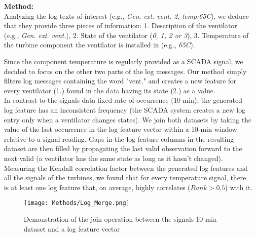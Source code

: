    \begin{flushleft}
      \textbf{Method:}\\
      Analyzing the log texts of interest (e.g., \emph{Gen. ext. vent. 2, temp:65\degree C}), we deduce that they provide three pieces of information: 
      1. Description of the ventilator (e.g., \emph{Gen. ext. vent.}), 2. State of the ventilator (\emph{0, 1, 2 or 3}), 
      3. Temperature of the turbine component the ventilator is installed in (e.g., \emph{65\degree C}).
    \end{flushleft}
    Since the component temperature is regularly provided as a SCADA signal, we decided to focus on the other two parts of the log messages. 
    Our method simply filters log messages containing the word "vent." and creates a new feature for every ventilator (1.) found in the data having its state (2.) as a value.\\
    In contrast to the signals data fixed rate of occurrence (10 min), the generated log feature has an inconsistent frequency (the SCADA system creates a new log entry only 
    when a ventilator changes states). We join both datasets by taking the value of the last occurrence in the log feature vector within a 10-min window relative to a signal reading. 
    Gaps in the log feature columns in the resulting dataset are then filled by propagating the last valid observation forward to the next valid (a ventilator has the same state as long as it hasn't changed).\\
    Measuring the Kendall correlation factor between the generated log features and all the signals of the turbines, we found that for every temperature signal, there is at least 
    one log feature that, on average, highly correlates ($Rank>0.5$) with it.

    \begin{figure}[!htbp]
      \begin{center}
        \texttt{[image: Methods/Log\_Merge.png]}
      \end{center}
      \caption{Demonstration of the join operation between the signals 10-min dataset and a log feature vector}
      \label{fig:log-merge}
    \end{figure}
    

